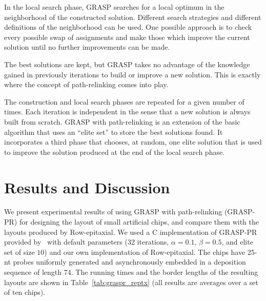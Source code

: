 \documentclass[english]{lni}
\newcommand{\ignore}[1]{}
\begin{document}
{In the local search phase, GRASP searches for a local optimum in the
neighborhood of the constructed solution. Different search strategies and
different definitions of the neighborhood can be used. One possible approach is
to check every possible swap of assignments and make those which improve the
current solution until no further improvements can be made.

The best
solutions are kept, but GRASP takes no advantage of the knowledge gained in
previously iterations to build or improve a new solution. This is exactly where
the concept of path-relinking comes into play.
}

The construction and local search phases are repeated for a given number of
times. Each iteration is independent in the sense that a new solution is always built
from scratch. GRASP with path-relinking is an extension of the basic algorithm
that uses an ``elite set'' to store the best solutions found. It incorporates
a third phase that chooses, at random, one elite solution that is used
to improve the solution produced at the end of the local search phase.

\ignore{
Solutions $p$ and $q$ are combined as follows. For every location
$k = 1, \ldots, n$, the path-relinking algorithm attempts to exchange facility
$p_k$ assigned to location $k$ in  solution $p$ with facility $q_k$ assigned to
location $k$ in the elite solution. In order to keep the solution $p$ feasible,
it exchanges $p_k$ with $p_l$, where $p_l = q_k$. This exchange is
performed only if it results in a better solution. The result of the
path-relinking phase is a solution $r$ that is as good as $p$ and $q$.
For more details on GRASP with path-relinking, we refer to~\cite{OLIVEIRA04}.
}

\section{Results and Discussion}
\label{sec:results}

We present experimental results of using GRASP with path-relinking (GRASP-PR)
for designing the layout of small artificial chips, and compare them with the
layouts produced by Row-epitaxial. We used a C implementation of GRASP-PR provided
by~\cite{OLIVEIRA04} with default parameters (32 iterations, $\alpha=0.1$,
$\beta=0.5$, and elite set of size $10$) and our own implementation of
Row-epitaxial. The chips have 25-nt probes uniformly generated and asynchronously
embedded in a deposition sequence of length 74. The running times and the border
lengths of the resulting layouts are shown in Table~\ref{tab:graspr_reptx} (all
results are averages over a set of ten chips).
\end{document}
